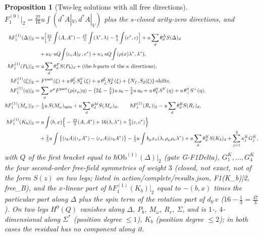 \documentclass[11pt]{article}
\numberwithin{equation}{section}
\theoremstyle{plain}
\newtheorem{proposition}[theorem]{Proposition}
\theoremstyle{definition}
\newcommand{\AV}{A|_V}
\newcommand{\Ob}{\mathrm{Ob}}
\begin{document}
\begin{proposition}[Two-leg solutions with all free directions]
\label{prop:at-c-sol}
$F_1^{(0)}|_2=\tfrac{27}{16}u\int(d^*\AV,d^*\AV)$ plus the $s$-closed arity-zero directions, and
\[
\begin{aligned}
\hbar F_1^{(1)}(\Delta)|_2&=u\Big[\tfrac{22}3\int(A,A^*)-\tfrac{47}3\int(\lambda^*,\lambda)-\tfrac83\int(c^*,c)\Big]+u\sum_d\theta^\Delta_dS(\Delta)_d\\
&\quad+\kappa_V\,uQ\!\int(\iota_x\AV,c^*)+\kappa_\lambda\,uQ\!\int(\rho(x)\lambda^*,\lambda^*),\\
\hbar F_1^{(1)}(P_b)|_2&=u\sum_d\theta^P_dS(P_b)_d+(\text{the }b\text{-parts of the }\kappa\text{ directions}),\\
\hbar F_1^{(1)}(\xi)|_2&=F^{\rm part}(\xi)+u\,\theta^\xi_VS^V_2(\xi)+u\,\theta^\xi_\perp S^\perp_2(\xi)+\{N_f,S_2(\xi)\}\text{-shifts},\\
\hbar F_1^{(1)}(\eta)|_2&=\sum_\mu x^\mu F^{\rm part}(\rho(e_\mu)\eta)-\big(3L-\tfrac32\big)u\,s_0-\tfrac52u\,u_0+u\,\theta^{\eta}_VS^V(\eta)+u\,\theta^{\eta}_\perp S^\perp(\eta),\\
\hbar F_1^{(1)}(M_\omega)|_2&=\tfrac13u\,S(M_\omega)_{\rm spin}+u\sum_d\theta^M_dS(M_\omega)_d,\qquad \hbar F_1^{(1)}(R_r)|_2=u\sum_d\theta^R_dS(R_r)_d,\\
\hbar F_1^{(1)}(K_b)|_2&=u\int(b,x)\Big\{-\tfrac{22}3(A,A^*)+16(\lambda,\lambda^*)+\tfrac83(c,c^*)\Big\}\\
&\quad+\tfrac23u\int\big\{(\iota_bA)(\iota_xA^*)-(\iota_xA)(\iota_bA^*)\big\}-\tfrac13u\int b_\mu x_\nu(\lambda,\rho_\mu\rho_\nu\lambda^*)+u\sum_d\theta^K_dS(K_b)_d+\sum_{j=1}^4\kappa^K_jG^K_j,
\end{aligned}
\]
with $Q$ of the first bracket equal to $\hbar\Ob^{(1)}(\Delta)|_2$ (gate G-F1Delta), $G^K_1,\dots,G^K_4$ the four second-order free-field symmetries of weight $3$ (closed, not exact, not of the form $S(z)$ on two legs; listed in action/complete/results.json, F1(K\_b)|2, free\_B), and the $x$-linear part of $\hbar F_1^{(1)}(K_b)|_2$ equal to $-(b,x)$ times the particular part along $\Delta$ plus the spin term of the rotation part of $d_{b'}v$ ($16-\tfrac13=\tfrac{47}3$). On two legs $H^0(Q)$ vanishes along $\Delta$, $P_b$, $M_\omega$, $R_r$, $\Sigma$, and is $1$-, $4$-dimensional along $\Sigma^*$ (position degree $\le1$), $K_b$ (position degree $\le2$); in both cases the residual has no component along it.
\end{proposition}
\end{document}
